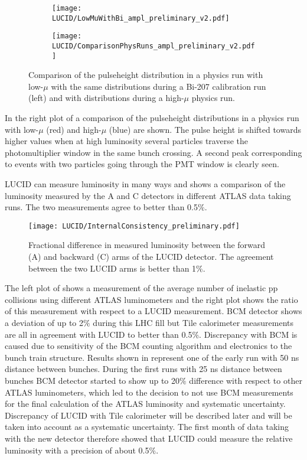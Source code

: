 \begin{figure}
\centering
\begin{subfigure}{.5\textwidth}
  \centering
  \texttt{[image: LUCID/LowMuWithBi\_ampl\_preliminary\_v2.pdf]}
  \label{fig:sub1}
\end{subfigure}%
\begin{subfigure}{.5\textwidth}
  \centering
  \texttt{[image: LUCID/ComparisonPhysRuns\_ampl\_preliminary\_v2.pdf]}
  \label{fig:sub2}
\end{subfigure}
\caption{Comparison of the pulseheight distribution in a physics run with low-$\mu$ with the same distributions 
during a Bi-207 calibration run (left) and with distributions during a high-$\mu$ physics run.}
\label{fig:Pulseheight}
\end{figure}

In the right plot of  a comparison of the pulseheight distributions in a physics run 
with low-$\mu$ (red) and high-$\mu$ (blue) are shown. The pulse height is shifted towards higher values when at high 
luminosity several particles traverse the photomultiplier window in the same bunch crossing.
A second peak corresponding to events with two particles going through the PMT window is clearly seen.

LUCID can measure luminosity in many ways and  shows a comparison of the 
luminosity measured by the A and C detectors in different ATLAS data taking runs. The two measurements agree to better than 0.5$\%$.

\begin{figure}
\centering
\texttt{[image: LUCID/InternalConsistency\_preliminary.pdf]}
\caption{Fractional difference in measured luminosity between the forward (A) and backward (C) arms of the LUCID 
detector. The agreement between the two LUCID arms is better than 1$\%$.}
\label{fig:InternalConsistency}
\end{figure}

The left plot of  shows a measurement of the average number of inelastic pp collisions 
using different ATLAS 
luminometers and the right plot shows the ratio of this measurement with respect to a LUCID measurement. BCM 
detector shows a deviation of up to 2$\%$ during this LHC fill but Tile calorimeter measurements are all in agreement 
with LUCID to better than 0.5$\%$.
Discrepancy with BCM is caused due to sensitivity of the BCM counting algorithm and electronics to the bunch train structure.
Results shown in  represent one of the early run with 50 ns distance between bunches.
During the first runs with 25 ns distance between bunches BCM detector started to show up to 20$\%$ difference 
with respect to other ATLAS luminometers, which led to the decision to not use BCM measurements for the final calculation of the ATLAS luminosity and systematic uncertainty.
Discrepancy of LUCID with Tile calorimeter will be described later and will be taken into account as a systematic uncertainty.
The first month of data taking with the new detector therefore showed that LUCID could measure the relative 
luminosity with a precision of about 0.5$\%$.

